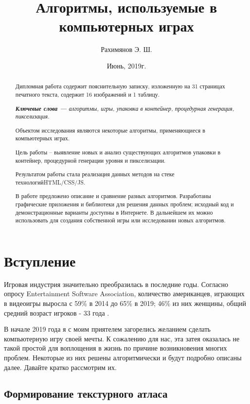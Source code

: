 \documentclass[a4paper,12pt]{report}
\title{Алгоритмы, используемые в компьютерных играх}
\author{Рахимянов Э. Ш.}
\date{Июнь, 2019г.}
\begin{document}
\maketitle

\begin{abstract}
Дипломная работа содержит пояснительную записку,
изложенную на 31 страницах печатного текста, содержит 16 изображений и 1 таблицу.

\textit{\textbf{Ключевые слова --- }алгоритмы, игры, упаковка в контейнер, процедурная генерация, пикселизация.}

Объектом исследования являются некоторые алгоритмы, применяющиеся в компьютерных играх.

Цель работы – выявление новых и анализ существующих алгоритмов упаковки в контейнер, процедурной генерации уровня и пикселизации.

Результатом работы стала реализация данных методов на стеке технологий\newline HTML/CSS/JS.

В работе предложено описание и сравнение разных алгоритмов. Разработаны графические приложения и библиотеки для решения данных проблем; исходный код и демонстрационные варианты доступны в Интернете. В дальнейшем их можно использовать для создания собственной игры или исследовании новых алгоритмов.
\end{abstract}

\tableofcontents

\chapter{Вступление}

\parindent=1cm
Игровая индустрия значительно преобразилась в последние годы. Согласно опросу Entertainment Software Association, количество американцев, играющих в видеоигры выросла с 59\% в 2014 до 65\% в 2019; 46\% из них женщины, общий средний возраст игроков - 33 года \citep{esa_old}\citep{esa}.

В начале 2019 года я с моим приятелем загорелись желанием сделать компьютерную игру своей мечты. К сожалению для нас, эта затея оказалась не такой простой для воплощения в жизнь по причине возникновения многих проблем. Некоторые из них решены алгоритмически и будут подробно описаны далее. Давайте кратко рассмотрим их.

\section{Формирование текстурного атласа}
\end{document}
